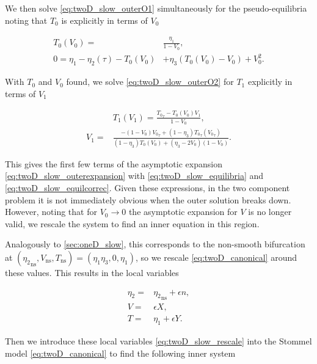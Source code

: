 We then solve \eqref{eq:twoD_slow_outerO1} simultaneously for the pseudo-equilibria noting that $T_0$ is explicitly in terms of $V_0$ 

\begin{equation}\label{eq:twoD_slow_equilibria}
\begin{aligned}
T_0(V_0)=&\frac{\eta_1}{1-V_0},\\
0=\eta_1-\eta_2(\tau)-T_0(V_0)&+\eta_3(T_0(V_0)-V_0)+V_0^2.
\end{aligned}
\end{equation}

With $T_0$ and $V_0$ found, we solve \eqref{eq:twoD_slow_outerO2} for $T_1$ explicitly in terms of $V_1$ 

\begin{equation}\label{eq:twoD_slow_equilcorrec}
\begin{aligned}
&T_1(V_1) = \frac{{T_0}_\tau-T_0(V_0)V_1}{1-V_0},\\
V_1 =& \frac{-(1-V_0){V_0}_\tau+(1-\eta_3){T_0}_\tau({V_0}_\tau)}{(1-\eta_3)T_0(V_0)+(\eta_3-2V_0)(1-V_0)}.
\end{aligned}
\end{equation}

This gives the first few terms of the asymptotic expansion \eqref{eq:twoD_slow_outerexpansion} with \eqref{eq:twoD_slow_equilibria} and \eqref{eq:twoD_slow_equilcorrec}. Given these expressions, in the two component problem it is not immediately obvious when the outer solution breaks down. However, noting that for $V_0\to 0$ the asymptotic expansion for $V$ is no longer valid, we rescale the system to find an inner equation in this region. 

\indent Analogously to \autoref{sec:oneD_slow}, this corresponds to the non-smooth bifurcation at $({\eta_2}_{\text{ns}},V_{\text{ns}},T_{\text{ns}})=(\eta_1\eta_3,0,\eta_1)$, so we rescale \eqref{eq:twoD_canonical} around these values. This results in the local variables

\begin{equation}\label{eq:twoD_slow_rescale}
\begin{aligned}
\eta_2=&{\eta_2}_{\text{ns}}+\epsilon n,\\
V=&\epsilon X,\\
T=&\eta_1+\epsilon Y.
\end{aligned}
\end{equation}

Then we introduce these local variables \eqref{eq:twoD_slow_rescale} into the Stommel model \eqref{eq:twoD_canonical} to find the following inner system

